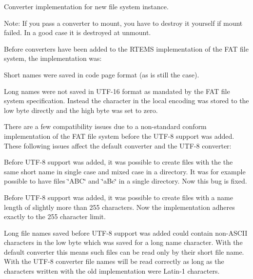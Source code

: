 Converter implementation for new file system instance. 

Note\+: If you pass a converter to mount, you have to destroy it yourself if mount failed. In a good case it is destroyed at unmount.

Before converters have been added to the R\+T\+E\+MS implementation of the F\+AT file system, the implementation was\+:
\begin{DoxyItemize}
\item Short names were saved in code page format (as is still the case).
\item Long names were not saved in U\+T\+F-\/16 format as mandated by the F\+AT file system specification. Instead the character in the local encoding was stored to the low byte directly and the high byte was set to zero.
\end{DoxyItemize}

There are a few compatibility issues due to a non-\/standard conform implementation of the F\+AT file system before the U\+T\+F-\/8 support was added. These following issues affect the default converter and the U\+T\+F-\/8 converter\+:
\begin{DoxyItemize}
\item Before U\+T\+F-\/8 support was added, it was possible to create files with the the same short name in single case and mixed case in a directory. It was for example possible to have files \char`\"{}\+A\+B\+C\char`\"{} and \char`\"{}a\+Bc\char`\"{} in a single directory. Now this bug is fixed.
\item Before U\+T\+F-\/8 support was added, it was possible to create files with a name length of slightly more than 255 characters. Now the implementation adheres exactly to the 255 character limit.
\item Long file names saved before U\+T\+F-\/8 support was added could contain non-\/\+A\+S\+C\+II characters in the low byte which was saved for a long name character. With the default converter this means such files can be read only by their short file name. With the U\+T\+F-\/8 converter file names will be read correctly as long as the characters written with the old implementation were Latin-\/1 characters.
\end{DoxyItemize}

